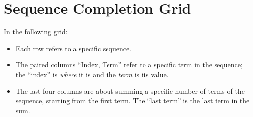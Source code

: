\documentclass{article}
\begin{document}
\vspace*{\fill}

\section*{Sequence Completion Grid}

\begin{minipage}{.5\textwidth}
In the following grid:
\begin{itemize}
\item Each row refers to a specific sequence.
\item The paired columns ``Index, Term'' refer to a specific term in the sequence; the ``index'' is \emph{where} it is and the \emph{term} is its value.
\item The last four columns are about summing a specific number of terms of the sequence, starting from the first term.
The ``last term'' is the last term in the sum.
\end{itemize}
\end{minipage}

\vspace*{\fill}
\end{document}
